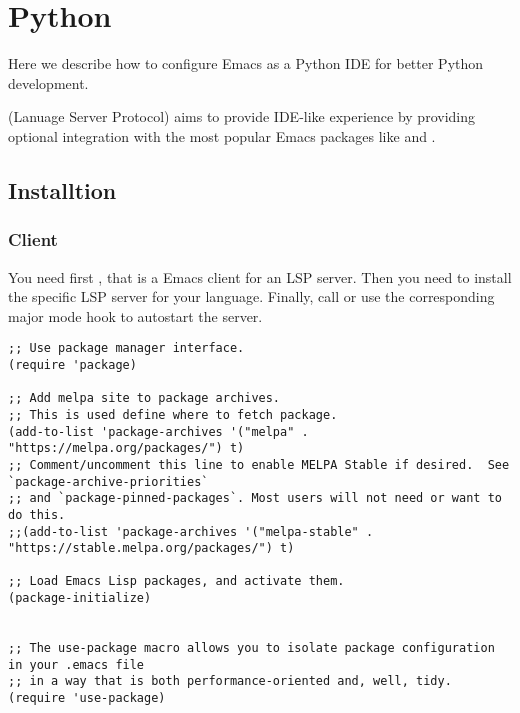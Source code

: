 
\chapter{Python}
\label{cha:python}

Here we describe how to configure Emacs as a Python IDE for better Python development.

 (Lanuage Server Protocol) aims to provide IDE-like experience by providing optional integration with the most popular Emacs packages like  and .


\section{Installtion}
\label{sec:installtion}

\subsection{Client}
\label{sec:client}



You need first , that is a Emacs client for an LSP server.
Then you need to install the specific LSP server for your language.
Finally, call  or use the corresponding major mode hook to autostart the server.

\begin{lstlisting}[language=elisp]
;; Use package manager interface.
(require 'package)

;; Add melpa site to package archives.
;; This is used define where to fetch package.
(add-to-list 'package-archives '("melpa" . "https://melpa.org/packages/") t)
;; Comment/uncomment this line to enable MELPA Stable if desired.  See `package-archive-priorities`
;; and `package-pinned-packages`. Most users will not need or want to do this.
;;(add-to-list 'package-archives '("melpa-stable" . "https://stable.melpa.org/packages/") t)

;; Load Emacs Lisp packages, and activate them.
(package-initialize)


;; The use-package macro allows you to isolate package configuration in your .emacs file
;; in a way that is both performance-oriented and, well, tidy.
(require 'use-package)

\end{lstlisting}

